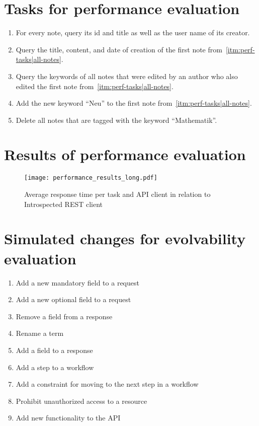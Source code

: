 \onecolumn{}
\section{Tasks for performance evaluation}\label{app:perf-tasks}

\begin{enumerate}[label=\textbf{T\arabic*}]
    \item\label{itm:perf-tasks|all-notes} For every note, query its id and title as well as the user name of its creator.
    \item\label{itm:perf-tasks|first-note} Query the title, content, and date of creation of the first note from~\ref{itm:perf-tasks|all-notes}.
    \item\label{itm:perf-tasks|related-keywords} Query the keywords of all notes that were edited by an author who also edited the first note from~\ref{itm:perf-tasks|all-notes}.
    \item\label{itm:perf-tasks|add-keyword} Add the new keyword \enquote{Neu} to the first note from~\ref{itm:perf-tasks|all-notes}.
    \item\label{itm:perf-tasks|delete-with-keyword} Delete all notes that are tagged with the keyword \enquote{Mathematik}.
\end{enumerate}

\section{Results of performance evaluation}\label{app:perf-results}

\begin{figure}[!ht]
    \centering
    \texttt{[image: performance\_results\_long.pdf]}
    \caption{Average response time per task and API client in relation to Introspected REST client}
\end{figure}

\newpage{}
\section{Simulated changes for evolvability evaluation}\label{app:evolvability-changes}

\begin{enumerate}[label=\textbf{C\arabic*}]
    \item Add a new mandatory field to a request
    \item Add a new optional field to a request
    \item Remove a field from a response
    \item Rename a term
    \item Add a field to a response
    \item Add a step to a workflow
    \item Add a constraint for moving to the next step in a workflow
    \item Prohibit unauthorized access to a resource
    \item Add new functionality to the API 
\end{enumerate}

